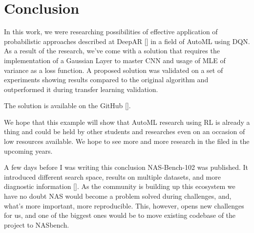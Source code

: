 \chapter{Conclusion}

In this work, we were researching possibilities of effective application of probabilistic approaches described at DeepAR [\cite{2017arXiv170404110S}] in a field of AutoML using DQN. As a result of the research, we've come with a solution that requires the implementation of a Gaussian Layer to master CNN and usage of MLE of variance as a loss function. A proposed solution was validated on a set of experiments showing results compared to the original algorithm and outperformed it during transfer learning validation.

The solution is available on the GitHub [\cite{github}].

We hope that this example will show that AutoML research using RL is already a thing and could be held by other students and researches even on an occasion of low resources available. We hope to see more and more research in the filed in the upcoming years.

A few days before I was writing this conclusion NAS-Bench-102 was published. It introduced different search space, results on multiple datasets, and more diagnostic information [\cite{nas102}]. As the community is building up this ecosystem we have no doubt NAS would become a problem solved during challenges, and, what's more important, more reproducible. This, however, opens new challenges for us, and one of the biggest ones would be to move existing codebase of the project to NASbench.

